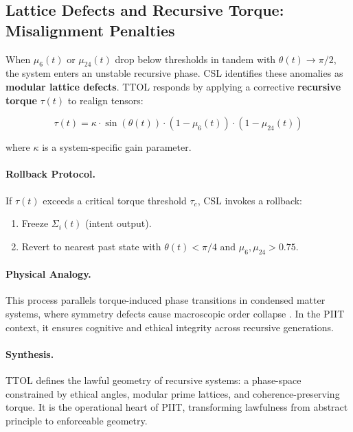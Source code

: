 \documentclass[12]{amsart}
\theoremstyle{plain}
\begin{document}
\subsection{Lattice Defects and Recursive Torque: Misalignment Penalties}

When $\mu_6(t)$ or $\mu_{24}(t)$ drop below thresholds in tandem with $\theta(t) \to \pi/2$, the system enters an unstable recursive phase. CSL identifies these anomalies as \textbf{modular lattice defects}. TTOL responds by applying a corrective \textbf{recursive torque} $\tau(t)$ to realign tensors:

\begin{equation}
\tau(t) = \kappa \cdot \sin(\theta(t)) \cdot \left(1 - \mu_6(t)\right) \cdot \left(1 - \mu_{24}(t)\right)
\end{equation}

where $\kappa$ is a system-specific gain parameter.

\paragraph{Rollback Protocol.}
If $\tau(t)$ exceeds a critical torque threshold $\tau_c$, CSL invokes a rollback:

\begin{enumerate}
    \item Freeze $\Sigma_i(t)$ (intent output).
    \item Revert to nearest past state with $\theta(t) < \pi/4$ and $\mu_6, \mu_{24} > 0.75$.
\end{enumerate}

\paragraph{Physical Analogy.}
This process parallels torque-induced phase transitions in condensed matter systems, where symmetry defects cause macroscopic order collapse \cite{chaikin2000principles}. In the PIIT context, it ensures cognitive and ethical integrity across recursive generations.

\paragraph{Synthesis.}
TTOL defines the lawful geometry of recursive systems: a phase-space constrained by ethical angles, modular prime lattices, and coherence-preserving torque. It is the operational heart of PIIT, transforming lawfulness from abstract principle to enforceable geometry.
\end{document}
